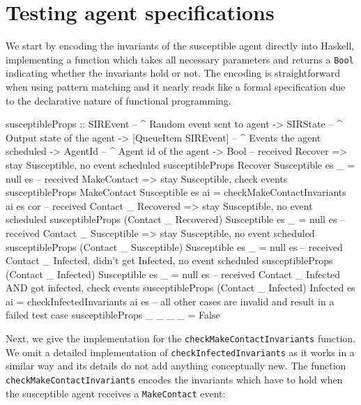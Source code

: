 \section{Testing agent specifications}
\label{sec:method}

We start by encoding the invariants of the susceptible agent directly into Haskell, implementing a function which takes all necessary parameters and returns a \texttt{Bool} indicating whether the invariants hold or not. The encoding is straightforward when using pattern matching and it nearly reads like a formal specification due to the declarative nature of functional programming.

\begin{HaskellCode}
susceptibleProps :: SIREvent              -- ^ Random event sent to agent
                 -> SIRState              -- ^ Output state of the agent
                 -> [QueueItem SIREvent]  -- ^ Events the agent scheduled
                 -> AgentId               -- ^ Agent id of the agent
                 -> Bool
-- received Recover => stay Susceptible, no event scheduled
susceptibleProps Recover Susceptible es _ = null es
-- received MakeContact => stay Susceptible, check events
susceptibleProps MakeContact Susceptible es ai
  = checkMakeContactInvariants ai es cor 
-- received Contact _ Recovered => stay Susceptible, no event scheduled
susceptibleProps (Contact _ Recovered) Susceptible es _ = null es
-- received Contact _ Susceptible => stay Susceptible, no event scheduled
susceptibleProps (Contact _ Susceptible) Susceptible es _  = null es
-- received Contact _ Infected, didn't get Infected, no event scheduled
susceptibleProps (Contact _ Infected) Susceptible es _ = null es
-- received Contact _ Infected AND got infected, check events
susceptibleProps (Contact _ Infected) Infected es ai
  = checkInfectedInvariants ai es
-- all other cases are invalid and result in a failed test case
susceptibleProps _ _ _ _ = False
\end{HaskellCode}

Next, we give the implementation for the \texttt{checkMakeContactInvariants} function. We omit a detailed implementation of \texttt{checkInfectedInvariants} as it works in a similar way and its details do not add anything conceptually new. The function \texttt{checkMakeContactInvariants} encodes the invariants which have to hold when the susceptible agent receives a \texttt{MakeContact} event:

